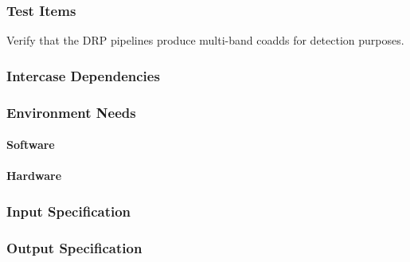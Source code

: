 \subsubsection{Test Items}
Verify that the DRP pipelines produce multi-band coadds for detection
purposes.



\subsubsection{Intercase Dependencies}

\subsubsection{Environment Needs}

\paragraph{Software}

\paragraph{Hardware}

\subsubsection{Input Specification}



\subsubsection{Output Specification}

